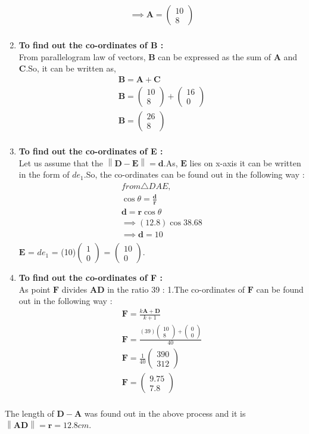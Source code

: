 \documentclass{article}
\providecommand{\norm}[1]{\left\lVert#1\right\rVert}
\newcommand{\myvec}[1]{\ensuremath{\begin{pmatrix}#1\end{pmatrix}}}
\let\vec\mathbf
\begin{document}
\begin{enumerate}
\begin{align}
			\implies \vec{A} = \myvec{10\\8} \\
		\end{align}
	\item \textbf{To find out the co-ordinates of B :}\\
		From parallelogram law of vectors, $\vec{B}$ can be expressed as the sum of $\vec{A}$ and $\vec{C}$.So, it can be written as,\\
		\begin{align}
			\vec{B} = \vec{A} + \vec{C}\\
			\vec{B} = \myvec{10\\8} + \myvec{16\\0}\\
			\vec{B} = \myvec{26\\8}\\
		\end{align}
	\item \textbf{To find out the co-ordinates of E :}\\
		Let us assume that the $\norm{\vec{D} - \vec{E}} = \vec{d}$.As, $\vec{E}$ lies on x-axis it can be written in the form of $de_1$.So, the co-ordinates can be found out in the following way : \\
		\begin{align}
			from \triangle{DAE},\\
			\cos{\theta} = \frac{\vec{d}}{\vec{r}}\\
			\vec{d} = \vec{r}\cos{\theta}\\
			\implies (12.8)\cos{38.68} \\
			\implies \vec{d} = 10\\
		\end{align}
		 $\vec{E}$ = $de_1$ = (10)$\myvec{1\\0}$ = $\myvec{10\\0}$.\\
	 \item \textbf{To find out the co-ordinates of F :}\\
		 As point $\vec{F}$ divides $\vec{AD}$ in the ratio 39 : 1.The co-ordinates of $\vec{F}$ can be found out in the following way : \\
		 \begin{align}
			 \vec{F} = \frac{k\vec{A} + \vec{D}}{k + 1}\\
			 \vec{F} = \frac{(39)\myvec{10\\8} + \myvec{0\\0}}{40}\\
			 \vec{F} = \frac{1}{40}\myvec{390\\312}\\
			 \vec{F} = \myvec{9.75\\7.8}\\
		 \end{align}
\end{enumerate}
		 The length of $\vec{D} - \vec{A}$ was found out in the above process and it is $\norm{\vec{AD}} = \vec{r} = 12.8cm$.
\end{document}
